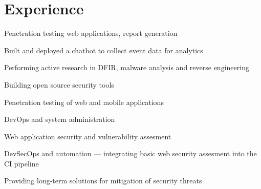 \documentclass[]{resume-openfont}
\begin{document}
\hfill
\begin{minipage}[t]{0.66\textwidth} 


\section{Experience}
\vspace{\topsep} %
\begin{tightemize}
\item Penetration testing web applications, report generation
\item Built and deployed a chatbot to collect event data for analytics
\end{tightemize}
\sectionsep

\begin{tightemize}
\item Performing active research in DFIR, malware analysis and reverse engineering
\item Building open source security tools	
\end{tightemize}
\sectionsep

\begin{tightemize}
\item Penetration testing of web and mobile applications
\item DevOps and system administration
\end{tightemize}
\sectionsep

\begin{tightemize}
\item Web application security and vulnerability assesment
\item DevSecOps and automation — integrating basic web security assesment into the CI pipeline
\item Providing long-term solutions for mitigation of security threats
\end{tightemize}
\sectionsep


\end{minipage}
\end{document}
